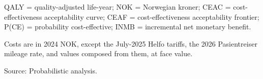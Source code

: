 \begin{table}[H]
{\begin{threeparttable}
\begin{tabular}[t]{rrlr}
\cellcolor[HTML]{F7F9FC}{\textcolor[HTML]{2D3748}{825,000}} & \cellcolor[HTML]{F7F9FC}{\textcolor[HTML]{2D3748}{99.7\%}} & \cellcolor[HTML]{F7F9FC}{\textcolor[HTML]{2D3748}{Exercise}} & \cellcolor[HTML]{F7F9FC}{\textcolor[HTML]{2D3748}{699,425}}\\
\bottomrule
\end{tabular}
\begin{tablenotes}
\item QALY = quality-adjusted life-year; NOK = Norwegian kroner; CEAC = cost-effectiveness acceptability curve; CEAF = cost-effectiveness acceptability frontier; P(CE) = probability cost-effective; INMB = incremental net monetary benefit.
\item Costs are in 2024 NOK, except the July-2025 Helfo tariffs, the 2026 Pasientreiser mileage rate, and values composed from them, at face value.
\item Source: Probabilistic analysis.
\end{tablenotes}
\end{threeparttable}
}
\end{table}
